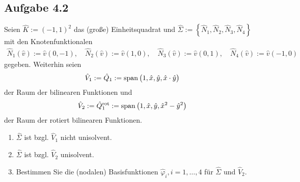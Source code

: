 \subsection{Aufgabe 4.2}
Seien $\hat{K}:=(-1,1)^2$ das (große) Einheitsquadrat und $\hat{\Sigma}:=\left\lbrace\hat{N}_1,\hat{N}_2,\hat{N}_3,\hat{N}_4\right\rbrace$ mit den Knotenfunktionalen 
\begin{align*}
	\hat{N}_1(\hat{v}):=\hat{v}(0,-1),\quad
	\hat{N}_2(\hat{v}):=\hat{v}(1,0),\quad
	\hat{N}_3(\hat{v}):=\hat{v}(0,1),\quad
	\hat{N}_4(\hat{v}):=\hat{v}(-1,0)
\end{align*}
gegeben. Weiterhin seien 
\begin{align*}
	\hat{V}_1:=\hat{Q}_1:=\operatorname{span}\big(1,\hat{x},\hat{y},\hat{x}\cdot\hat{y}\big)
\end{align*}
der Raum der bilinearen Funktionen und
\begin{align*}
	\hat{V}_2:=\hat{Q}_1^{\text{rot}}:=\operatorname{span}\big(1,\hat{x},\hat{y},\hat{x}^2-\hat{y}^2\big)
\end{align*}
der Raum der rotiert bilinearen Funktionen.
\begin{enumerate}[label=(\alph*)]
	\item $\hat{\Sigma}$ ist bzgl. $\hat{V}_1$ nicht unisolvent.
	\item $\hat{\Sigma}$ ist bzgl. $\hat{V}_2$ unisolvent.
	\item Bestimmen Sie die (nodalen) Basisfunktionen $\hat{\varphi}_i,i=1,\ldots,4$ für $\hat{\Sigma}$ und $\hat{V}_2$.
\end{enumerate}

